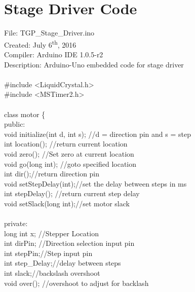 \section{\tgp Stage Driver Code} \label{sec:stageCode}
\selectfont
\hspace*{-\parindent}
File: TGP\_Stage\_Driver.ino\\
Created: July 6\textsuperscript{th}, 2016\\
Compiler: Arduino IDE 1.0.5\--r2\\
Description: Arduino\--Uno embedded code  for stage driver\\
\\
\#include <LiquidCrystal.h>\\
\#include <MSTimer2.h>\\
\\
class motor \{\\
\tabto*{.5cm} public:\\
\tabto*{.5cm} void initialize(int d, int s); \tabto*{7.5cm}//d = direction pin and s = step\\
\tabto*{.5cm} int location(); \tabto*{7.5cm}//return current location\\
\tabto*{.5cm} void zero(); \tabto*{7.5cm}//Set zero at current location\\
\tabto*{.5cm} void go(long int); \tabto*{7.5cm}//goto specified location\\
\tabto*{.5cm} int dir();\tabto*{7.5cm}//return direction pin\\
\tabto*{.5cm} void setStepDelay(int);\tabto*{7.5cm}//set the delay between steps in ms\\
\tabto*{.5cm} int stepDelay();\tabto*{7.5cm} //return current step delay\\
\tabto*{.5cm} void setSlack(long int);\tabto*{7.5cm}//set motor slack\\
\\
\tabto*{.5cm} private:\\
\tabto*{.5cm} long int x; \tabto*{7.5cm}//Stepper Location\\
\tabto*{.5cm} int dirPin; \tabto*{7.5cm}//Direction selection input pin\\
\tabto*{.5cm} int stepPin;\tabto*{7.5cm}//Step input pin\\
\tabto*{.5cm} int step\_Delay;\tabto*{7.5cm}//delay between steps\\
\tabto*{.5cm} int slack;\tabto*{7.5cm}//backslash overshoot\\
\tabto*{.5cm} void over(); \tabto*{7.5cm}//overshoot to adjust for backlash\\

